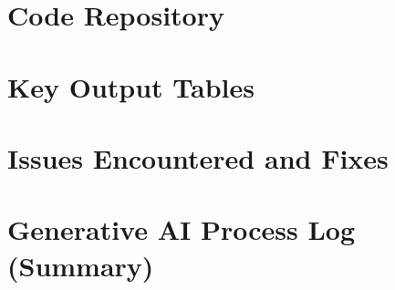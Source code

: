 \documentclass[manuscript,nonacm]{acmart} %
\begin{document}



\appendix

\section{Code Repository}
\label{app:code}

\section{Key Output Tables}
\label{app:tables}

\section{Issues Encountered and Fixes}
\label{app:issues}

\section{Generative AI Process Log (Summary)}
\label{app:ailog}
\end{document}
